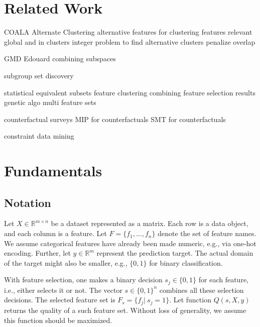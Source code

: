 \documentclass{article}
\begin{document}
\section{Related Work}
\label{sec:related-work}

COALA \cite{bae2006coala}
Alternate Clustering \cite{bailey2014alternative}
alternative features for clustering \cite{tao2012novel}
features relevant global and in clusters \cite{guan2011unified}
integer problem to find alternative clusters \cite{bae2010clustering}
penalize overlap \cite{mueller2009relevant}

GMD \cite{trittenbach2019dimension}
Edouard \cite{fouche2021efficient}
combining subspaces \cite{nguyen20134s}

subgroup set discovery \cite{leeuwen2012diverse}

statistical equivalent subsets \cite{lagani2017feature, borboudakis2021extending, tsamardinos2003towards, dougherty2006number}
feature clustering \cite{mueller2021feature}
combining feature selection results \cite{woznica2012model}
genetic algo multi feature sets \cite{siddiqi2020genetic}

counterfactual surveys \cite{verma2020counterfactual, stepin2021survey}
MIP for counterfactuals \cite{mohammadi2021scaling}
SMT for counterfactuals \cite{karimi2020model}

constraint data mining \cite{grossi2017survey}

\section{Fundamentals}
\label{sec:fundamentals}

\subsection{Notation}

Let $X \in \mathbb{R}^{m \times n}$ be a dataset represented as a matrix.
Each row is a data object, and each column is a feature.
Let $F = \{f_1, \dots, f_n\}$ denote the set of feature names.
We assume categorical features have already been made numeric, e.g., via one-hot encoding.
Further, let $y \in \mathbb{R}^m$ represent the prediction target.
The actual domain of the target might also be smaller, e.g., $\{0,1\}$ for binary classification.

With feature selection, one makes a binary decision $s_j \in \{0,1\}$ for each feature, i.e., either selects it or not.
The vector $s \in \{0,1\}^n$ combines all these selection decisions.
The selected feature set is $F_s = \{f_j|~s_j=1\}$.
Let function $Q(s,X,y)$ returns the quality of a such feature set.
Without loss of generality, we assume this function should be maximized.
\end{document}
